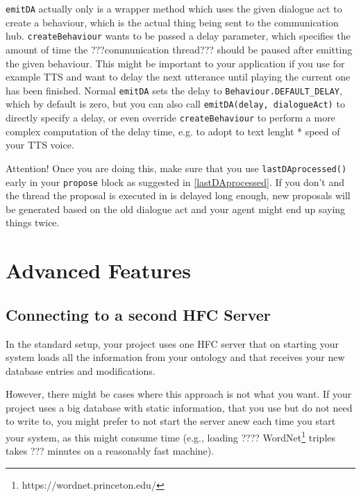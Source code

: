 \texttt{emitDA} actually only is a wrapper method which uses the given dialogue act to create a behaviour, which is the actual thing being sent to the communication hub. \texttt{createBehaviour} wants to be passed a delay parameter, which specifies the amount of time the ???communication thread??? 
should be paused after emitting the given behaviour. This might be important to your application if you use for example TTS and want to delay the next utterance until playing the current one has been finished.
Normal \texttt{emitDA} sets the delay to \texttt{Behaviour.DEFAULT\_DELAY}, which by default is zero, but you can also call \texttt{emitDA(delay, dialogueAct)} to directly specify a delay, or even override \texttt{createBehaviour} to perform a more complex computation of the delay time, e.g. to adopt to text lenght * speed of your TTS voice.

Attention! Once you are doing this, make sure that you use \texttt{lastDAprocessed()} early in your \texttt{propose} block as suggested in \ref{lastDAprocessed}. If you don't and the thread the proposal is executed in is delayed long enough, new proposals will be generated based on the old dialogue act and your agent might end up saying things twice.

\section{Advanced Features}

\subsection{Connecting to a second HFC Server} \label{sec:2ndHfc}
In the standard setup, your \vonda project uses one HFC server that on starting your system loads all the information from your ontology and that receives your new database entries and modifications.

However, there might be cases where this approach is not what you want. If your project uses a big database with static information, that you use but do not need to write to, you might prefer to not start the server anew each time you start your system, as this might consume time (e.g., loading ???? WordNet\footnote{https://wordnet.princeton.edu/} triples takes ??? minutes on a reasonably fast machine).


